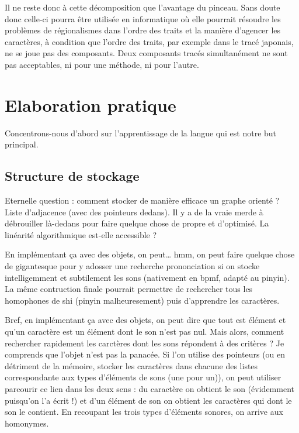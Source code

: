 \documentclass[12pt,onecolumn]{article} %
\begin{document}
Il ne reste donc à cette décomposition que l'avantage du pinceau. Sans doute donc celle-ci pourra être utilisée en informatique où elle pourrait résoudre les problèmes de régionalismes dans l'ordre des traits et la manière d'agencer les caractères, à condition que l'ordre des traits, par exemple dans le tracé japonais, ne se joue pas des composants. Deux composants tracés simultanément ne sont pas acceptables, ni pour une méthode, ni pour l'autre.

\section{Elaboration pratique}

Concentrons-nous d'abord sur l'apprentissage de la langue qui est notre but principal.

\subsection{Structure de stockage}

Eternelle question : comment stocker de manière efficace un graphe orienté ? Liste d'adjacence (avec des pointeurs dedans). Il y a de la vraie merde à débrouiller là-dedans pour faire quelque chose de propre et d'optimisé. La linéarité algorithmique est-elle accessible ?

En implémentant ça avec des objets, on peut… hmm, on peut faire quelque chose de gigantesque pour y adosser une recherche prononciation si on stocke intelligemment et subtilement les sons (nativement en bpmf, adapté au pinyin). La même contruction finale pourrait permettre de rechercher tous les homophones de shi (pinyin malheuresement) puis d'apprendre les caractères.

Bref, en implémentant ça avec des objets, on peut dire que tout est élément et qu'un caractère est un élément dont le son n'est pas nul. Mais alors, comment rechercher rapidement les carctères dont les sons répondent à des critères ? Je comprends que l'objet n'est pas la panacée. Si l'on utilise des pointeurs (ou en détriment de la mémoire, stocker les caractères dans chacune des listes correspondante aux types d'éléments de sons (une pour un)), on peut utiliser parcourir ce lien dans les deux sens : du caractère on obtient le son (évidemment puisqu'on l'a écrit !) et d'un élément de son on obtient les caractères qui dont le son le contient. En recoupant les trois types d'éléments sonores, on arrive aux homonymes.
\end{document}
